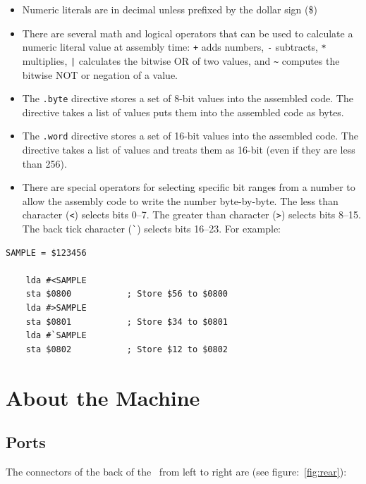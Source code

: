 \begin{itemize}
\item Numeric literals are in decimal unless prefixed by the dollar sign (\$)
\item There are several math and logical operators that can be used to calculate a numeric literal value at assembly time: \verb|+| adds numbers, \verb+-+ subtracts, \verb+*+ multiplies, \verb+|+ calculates the bitwise OR of two values, and \verb+~+ computes the bitwise NOT or negation of a value.
\item The \verb+.byte+ directive stores a set of 8-bit values into the assembled code. The directive takes a list of values puts them into the assembled code as bytes.
\item The \verb+.word+ directive stores a set of 16-bit values into the assembled code. The directive takes a list of values and treats them as 16-bit (even if they are less than 256).
\item There are special operators for selecting specific bit ranges from a number to allow the assembly code to write the number byte-by-byte. The less than character (\verb+<+) selects bits 0--7. The greater than character (\verb+>+) selects bits 8--15. The back tick character (\verb+`+) selects bits 16--23. For example:
\end{itemize}

\begin{Verbatim}[samepage=true]
    SAMPLE = $123456

    lda #<SAMPLE
    sta $0800           ; Store $56 to $0800
    lda #>SAMPLE
    sta $0801           ; Store $34 to $0801
    lda #`SAMPLE
    sta $0802           ; Store $12 to $0802
\end{Verbatim}

\section*{About the Machine}

\subsection*{Ports}

The connectors of the back of the \fjr\ from left to right are (see figure:~\ref{fig:rear}):

